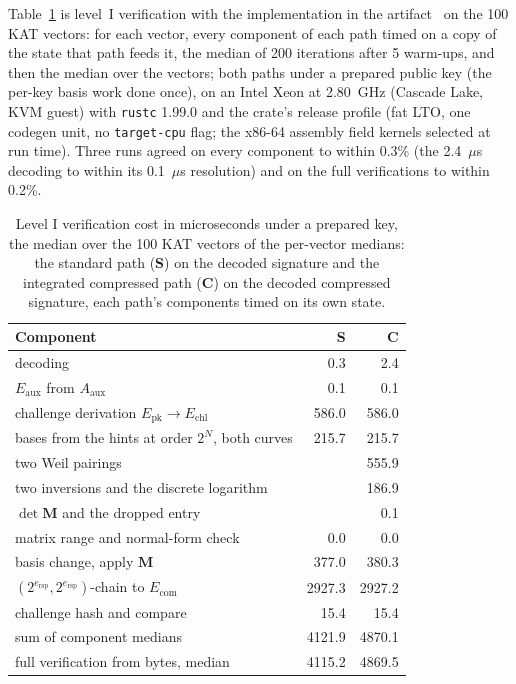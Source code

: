 \documentclass[version=submission]{iacrcc}
\newcommand{\ers}{e_{\mathrm{rsp}}}
\newcommand{\Mm}{\mathbf{M}}
\newcommand{\Echl}{E_{\mathrm{chl}}}
\newcommand{\Eaux}{E_{\mathrm{aux}}}
\newcommand{\Ecom}{E_{\mathrm{com}}}
\newcommand{\Epk}{E_{\mathrm{pk}}}
\begin{document}
Table~\ref{tab:breakdown} is level~I verification with the
implementation in the artifact~\cite{artifact} on the 100 KAT vectors: for each vector, every
component of each path timed on a copy of the state that path feeds it,
the median of 200 iterations after 5 warm-ups, and then the median over
the vectors; both paths under a prepared public key (the per-key basis
work done once), on an Intel Xeon at 2.80~GHz (Cascade Lake, KVM guest)
with \texttt{rustc} 1.99.0 and the crate's release profile (fat LTO, one
codegen unit, no \texttt{target-cpu} flag; the x86-64 assembly field
kernels selected at run time). Three runs agreed on every component to
within 0.3\% (the 2.4~$\mu$s decoding to within its 0.1~$\mu$s
resolution) and on the full verifications to within 0.2\%.

\begin{table}[H]
\centering
\caption{Level I verification cost in microseconds under a prepared key,
the median over the 100 KAT vectors of the per-vector medians: the
standard path (\textbf{S}) on the decoded signature and the integrated
compressed path (\textbf{C}) on the decoded compressed signature, each
path's components timed on its own state.}
\label{tab:breakdown}
\small
\begin{tabular}{l r r}
\toprule
\textbf{Component} & \textbf{S} & \textbf{C} \\
\midrule
decoding & 0.3 & 2.4 \\
$\Eaux$ from $A_{\mathrm{aux}}$ & 0.1 & 0.1 \\
challenge derivation $\Epk \to \Echl$ & 586.0 & 586.0 \\
bases from the hints at order $2^N$, both curves & 215.7 & 215.7 \\
two Weil pairings &  & 555.9 \\
two inversions and the discrete logarithm &  & 186.9 \\
$\det \Mm$ and the dropped entry &  & 0.1 \\
matrix range and normal-form check & 0.0 & 0.0 \\
basis change, apply $\Mm$ & 377.0 & 380.3 \\
$(2^{\ers}, 2^{\ers})$-chain to $\Ecom$ & 2927.3 & 2927.2 \\
challenge hash and compare & 15.4 & 15.4 \\
\midrule
sum of component medians & 4121.9 & 4870.1 \\
full verification from bytes, median & 4115.2 & 4869.5 \\
\bottomrule
\end{tabular}
\end{table}
\end{document}

